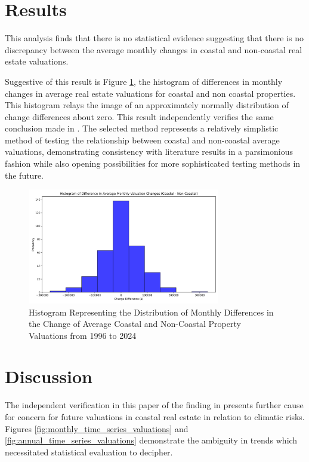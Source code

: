 \documentclass[12pt]{article}
\begin{document}
\section{Results}
\label{sec:resu}

This analysis finds that there is no statistical evidence suggesting that there is no discrepancy between the average monthly changes in coastal and non-coastal real estate valuations. 

Suggestive of this result is Figure \ref{fig:histogram_of_difference}, the histogram of differences in monthly changes in average real estate valuations for coastal and non coastal properties. This histogram relays the image of an approximately normally distribution of change differences about zero. This result independently verifies the same conclusion made in \citet{McNamara2024}. The selected method represents a relatively simplistic method of testing the relationship between coastal and non-coastal average valuations, demonstrating consistency with literature results in a parsimonious fashion while also opening possibilities for more sophisticated testing methods in the future.

\begin{figure}[h]
    \centering
    \includegraphics[width=0.75\textwidth]{figures/histogram_of_change_differnces.png}
    \caption{Histogram Representing the Distribution of Monthly Differences in the Change of Average Coastal and Non-Coastal Property Valuations from 1996 to 2024}
    \label{fig:histogram_of_difference}
\end{figure}

\section{Discussion}
\label{sec:disc}

The independent verification in this paper of the finding in \citet{McNamara2024} presents further cause for concern for future valuations in coastal real estate in relation to climatic risks. Figures \ref{fig:monthly_time_series_valuations} and \ref{fig:annual_time_series_valuations} demonstrate the ambiguity in trends which necessitated statistical evaluation to decipher.  
\end{document}
